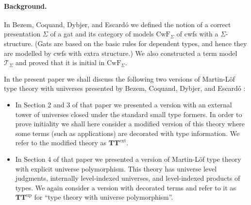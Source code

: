 \documentclass[11pt,a4paper]{article}
\theoremstyle{plain}
\theoremstyle{definition}
\newcommand{\T}{\mathsf{T}}
\def\T{\mathcal{T}}
\def\CwF{\mathrm{CwF}}
\def\Sigmaext{{\Sigma^\mathrm{ext}}}
\def\Sigmaint{{\Sigma^\mathrm{up}}}
\def\TText{{\mathbf{TT}^\mathrm{ext}}}
\def\TTint{{\mathbf{TT}^\mathrm{up}}}
\begin{document}
\paragraph{Background.} 
%

In Bezem, Coquand, Dybjer, and Escard\'o \cite{bezem:hofmann} we defined the notion of a correct presentation $\Sigma$ of a gat and its category of models $\CwF_\Sigma$ of cwfs with a $\Sigma$-structure. (Gats are based on the basic rules for dependent types, and hence they are modelled by cwfs with extra structure.) We also constructed a term model $\T_\Sigma$ and proved that it is initial in $\CwF_\Sigma$.

In the present paper we shall discuss the following two versions of Martin-Löf type theory with universes presented by Bezem, Coquand, Dybjer, and Escard\'o \cite{BezemCDE22}:
\begin{itemize}
\item In Section 2 and 3 of that paper we presented a version with an external tower of universes closed under the standard small type formers. In order to prove initiality we shall here consider a modified version of this theory where some terms (such as applications) are decorated with type information. We refer to the modified theory as $\TText$.
\item In Section 4 of that paper we presented a version of Martin-Löf type theory with explicit universe polymorphism. This theory has universe level judgments, internally level-indexed universes, and level-indexed products of types. We again consider a version with decorated terms and refer to it as $\TTint$ for ``type theory with universe polymorphism''. 
\end{itemize}
\end{document}
